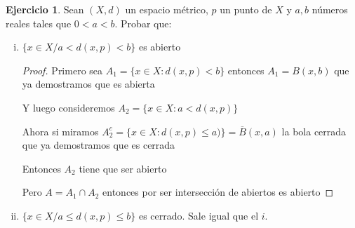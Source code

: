 \documentclass[11pt]{report}
\newcommand{\ol}{\overline}
\theoremstyle{definition}
\newtheorem{ej}{Ejercicio}
\begin{document}
\begin{ej}
	Sean $(X,d)$ un espacio métrico, $p$ un punto de $X$ y $a,b$ números reales tales que $0 <a<b$. Probar que:
	\begin{enumerate}[i.]
		\item $ \{ x \in X \text{/} a < d(x,p)<b\}$ es abierto
			\begin{proof}
				Primero sea $A_1 = \{x \in X : d(x,p) < b\}$ entonces $A_1 = B(x,b)$ que ya demostramos que es abierta

				Y luego consideremos $A_2 = \{x \in X : a < d(x,p)\}$

				Ahora si miramos $A_2^c = \{x \in X : d(x,p) \leq a)\} = \ol B (x,a)$ la bola cerrada que ya demostramos que es cerrada

				Entonces $A_2$ tiene que ser abierto

				Pero $A = A_1 \cap A_2$ entonces por ser intersección de abiertos es abierto
			\end{proof}
			
		\item $ \{ x \in X \text{/} a \leq d(x,p) \leq b\}$ es cerrado. Sale igual que el $i.$
	\end{enumerate}
\end{ej}
\end{document}
